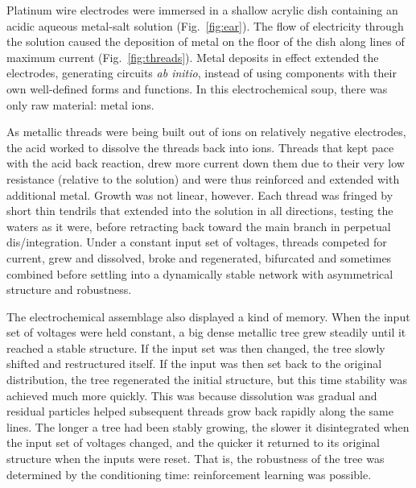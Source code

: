 



Platinum wire electrodes were immersed in a shallow acrylic dish containing an
acidic 
aqueous metal-salt
solution
\cite{pask1958physical}
(Fig.~\ref{fig:ear}).
The flow of electricity through the solution caused the deposition of metal
on the floor of the dish
along lines of maximum current
(Fig.~\ref{fig:threads}).
Metal deposits in effect extended the electrodes, generating circuits \textit{ab initio}, 
instead of using components with their own well-defined forms and functions.
In this electrochemical soup,
there was only raw material: metal ions. 

As metallic 
threads were being built out of ions on relatively negative electrodes,
the acid worked to dissolve the threads back into ions.
Threads that kept pace with the acid back reaction, drew more current down them 
due to their very low resistance (relative to the solution) and were thus
reinforced and extended with additional metal.
Growth was not linear, however.
Each thread was fringed 
by short thin tendrils that extended into the solution in all directions, testing the waters as it were, before retracting back toward the main branch in perpetual dis/integration.
Under a constant input set of voltages,
threads
competed for current, grew and dissolved, broke and regenerated, bifurcated and sometimes combined before settling into
a dynamically stable network with asymmetrical structure and robustness.

The electrochemical assemblage also displayed a kind of memory.
When the input set of voltages were held constant, a big dense metallic tree grew steadily until it reached a stable structure.
If the input set was then changed, the tree slowly
shifted and
restructured itself.
If the input was then set back to the original distribution,
the tree regenerated the initial structure, but this time stability was achieved much more quickly.
This was because dissolution was gradual and 
residual particles helped subsequent threads grow back rapidly along the same lines.
The longer a tree had been stably growing, the slower it disintegrated when the input set of voltages changed, and the quicker it returned to its original structure when the inputs were reset.
That is, the robustness of the tree was determined by the conditioning time:
reinforcement learning was possible.



